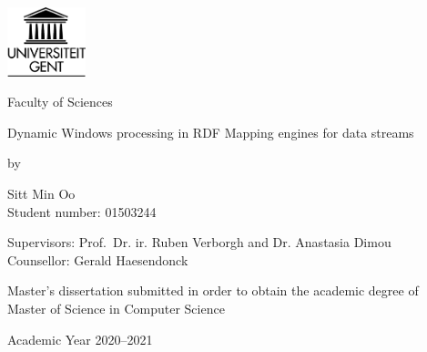 

\begin{titlepage}

    \setlength{\hoffset}{-1in}
    \setlength{\voffset}{-1in}
    \setlength{\topmargin}{1.5cm}
    \setlength{\headheight}{0.5cm}
    \setlength{\headsep}{1cm}
    \setlength{\oddsidemargin}{3cm}
    \setlength{\evensidemargin}{3cm}
    \setlength{\footskip}{1.5cm}
    \enlargethispage{1cm}

    \fontsize{12pt}{14pt}
    \selectfont

    \begin{center}

    \includegraphics[height=2cm]{fig/ruglogo.png}

    \vspace{0.5cm}

    Faculty of Sciences\\

    \vspace{3.5cm}

    \fontsize{17.28pt}{21pt}
    \selectfont
Dynamic Windows processing in RDF Mapping engines for data streams

    \fontsize{12pt}{14pt}
    \selectfont

    \vspace{.6cm}

    by

    \vspace{.4cm}

Sitt Min Oo\\
Student number: 01503244\\

    \vspace{3.5cm}

Supervisors: Prof.~Dr. ir. Ruben Verborgh and Dr. Anastasia Dimou\\
Counsellor: Gerald Haesendonck\\

    \vspace{2cm}

    Master's dissertation submitted in order to obtain the academic degree of\\
    Master of Science in Computer Science

    \vspace{1cm}

Academic Year 2020--2021

    \end{center}
    \end{titlepage}

